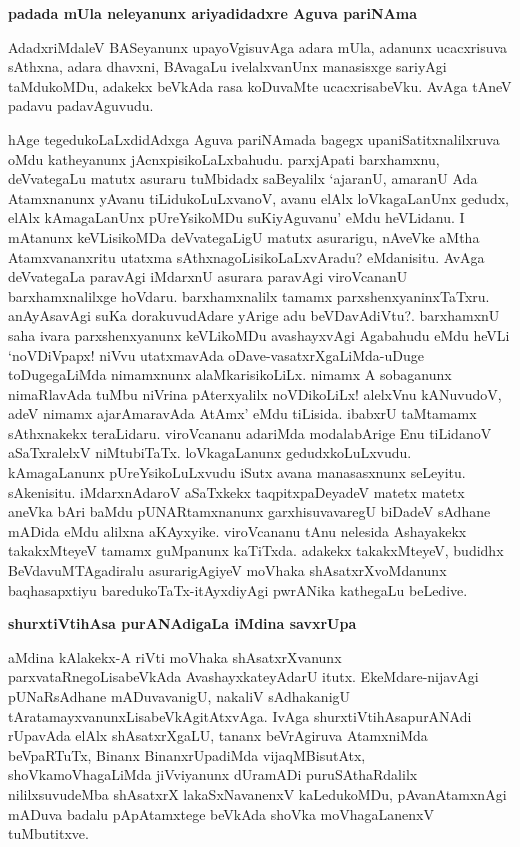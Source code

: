 \noindent
{\bf\large{padada mUla neleyanunx ariyadidadxre Aguva pariNAma}}

AdadxriMdaleV BASeyanunx upayoVgisuvAga adara mUla, adanunx ucacxrisuva sAthxna, adara dhavxni, BAvagaLu ivelalxvanUnx manasisxge sariyAgi taMdukoMDu, adakekx beVkAda rasa koDuvaMte ucacxrisabeVku. AvAga tAneV padavu padavAguvudu.

hAge tegedukoLaLxdidAdxga Aguva pariNAmada bagegx upaniSatitxnalilxruva oMdu katheyanunx jAcnxpisikoLaLxbahudu. parxjApati barxhamxnu, deVvategaLu matutx asuraru tuMbidadx saBeyalilx `ajaranU, amaranU Ada Atamxnanunx yAvanu tiLidukoLuLxvanoV, avanu elAlx loVkagaLanUnx gedudx, elAlx kAmagaLanUnx pUreYsikoMDu suKiyAguvanu' eMdu heVLidanu. I mAtanunx keVLisikoMDa deVvategaLigU matutx asurarigu, nAveVke aMtha Atamxvananxritu utatxma sAthxnagoLisikoLaLxvAradu? eMdanisitu. AvAga deVvategaLa paravAgi iMdarxnU asurara paravAgi viroVcananU barxhamxnalilxge hoVdaru. barxhamxnalilx tamamx parxshenxyaninxTaTxru. anAyAsavAgi suKa dorakuvudAdare yArige adu beVDavAdiVtu?. barxhamxnU saha ivara parxshenxyanunx keVLikoMDu avashayxvAgi Agabahudu eMdu heVLi `noVDiVpapx! niVvu utatxmavAda oDave-vasatxrXgaLiMda-uDuge toDugegaLiMda nimamxnunx alaMkarisikoLiLx. nimamx A sobaganunx nimaRlavAda tuMbu niVrina pAterxyalilx noVDikoLiLx! alelxVnu kANuvudoV, adeV nimamx ajarAmaravAda AtAmx' eMdu tiLisida. ibabxrU taMtamamx sAthxnakekx teraLidaru. viroVcananu adariMda modalabArige Enu tiLidanoV aSaTxralelxV niMtubiTaTx. loVkagaLanunx gedudxkoLuLxvudu. kAmagaLanunx pUreYsikoLuLxvudu iSutx avana manasasxnunx seLeyitu. sAkenisitu. iMdarxnAdaroV aSaTxkekx taqpitxpaDeyadeV matetx matetx aneVka bAri baMdu pUNARtamxnanunx garxhisuvavaregU biDadeV sAdhane mADida eMdu alilxna aKAyxyike. viroVcananu tAnu nelesida Ashayakekx takakxMteyeV tamamx guMpanunx kaTiTxda. adakekx takakxMteyeV, budidhx BeVdavuMTAgadiralu asurarigAgiyeV moVhaka shAsatxrXvoMdanunx baqhasapxtiyu baredukoTaTx-itAyxdiyAgi pwrANika kathegaLu beLedive.

\noindent
{\bf\large{shurxtiVtihAsa purANAdigaLa iMdina savxrUpa}}\label{page187}

aMdina kAlakekx-A riVti moVhaka shAsatxrXvanunx parxvataRnegoLisabeVkAda AvashayxkateyAdarU itutx. EkeMdare-nijavAgi pUNaRsAdhane mADuvavanigU, nakaliV sAdhakanigU tAratamayxvanunxLisabeVkAgitAtxvAga. IvAga shurxtiVtihAsapurANAdi rUpavAda elAlx shAsatxrXgaLU, tananx beVrAgiruva AtamxniMda beVpaRTuTx, Binanx BinanxrUpadiMda vijaqMBisutAtx, shoVkamoVhagaLiMda jiVviyanunx dUramADi puruSAthaRdalilx nililxsuvudeMba shAsatxrX lakaSxNavanenxV kaLedukoMDu, pAvanAtamxnAgi mADuva badalu pApAtamxtege beVkAda shoVka moVhagaLanenxV tuMbutitxve.

